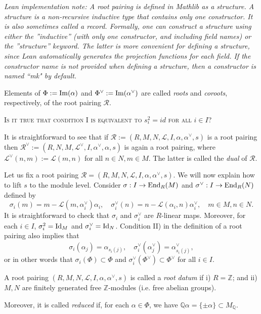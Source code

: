{\it Lean implementation note: A root pairing is defined in Mathlib as a {\it structure}. A structure is a non-recursive inductive 
type that contains only one constructor. It is also sometimes called a {\it record}. Formally, one can construct a structure using either
the ''inductive'' (with only one constructor, and including field names) or the ''structure'' keyword. The latter is more convenient for defining a structure,
since Lean automatically generates the projection functions for each field. If the constructor name is not provided when defining a structure, then a 
constructor is named ``mk" by default.}

Elements of $\Phi := {\rm Im}(\alpha)$ and $\Phi^\vee := {\rm Im}(\alpha^\vee)$ are called {\it roots} and {\it coroots}, 
respectively, of the root pairing $\mathcal{R}$. 

\textsc{Is it true that condition I is equivalent to $s_i^2 = id$ for all $i \in I$?}

\begin{remark}
    \label{def:dual-root-pairing}
    \leanok
It is straightforward to see that if $\mathcal{R} := (R,M,N,\mathcal{L},I,\alpha, \alpha^\vee,s)$ is 
a root pairing then $\mathcal{R}^\vee := (R,N,M,\mathcal{L}^\vee,I,\alpha^\vee, \alpha,s)$ is again 
a root pairing, where $\mathcal{L}^\vee (n,m) := \mathcal{L}(m,n)$ for all $n \in N,m \in M$. The 
latter is called the {\it dual} of $\mathcal{R}$.
\end{remark}

Let us fix a root pairing $\mathcal{R} = (R,M,N,\mathcal{L},I,\alpha, \alpha^\vee,s)$. We will now 
explain how to lift $s$ to the module level. Consider $\sigma: I \to {\rm End}_R(M)$ and 
$\sigma^\vee : I \to {\rm End}_R(N)$ defined by
\[
    \sigma_i(m) = m - \mathcal{L}(m,\alpha^\vee_i)\alpha_i, \quad \sigma^\vee_i(n) = n - \mathcal{L}(\alpha_i,n)\alpha^\vee_i, \quad m \in M, n \in N.
\]
It is straightforward to check that $\sigma_i$ and $\sigma^\vee_i$ are $R$-linear maps. Moreover, 
for each $i \in I$, $\sigma_i^2 = {\rm Id}_M$ and $\sigma_i^\vee = {\rm Id}_N$. Condition II) in the 
definition of a root pairing also implies that 
\[
    \sigma_i(\alpha_j) = \alpha_{s_i(j)}, \quad \sigma^\vee_i(\alpha^\vee_j) = \alpha^\vee_{s_i(j)},
\]
or in other words that $\sigma_i(\Phi) \subset \Phi$ and 
$\sigma_i^\vee(\Phi^\vee) \subset \Phi^\vee$ for all $i \in I$.

\begin{definition}
    \label{def:root-datum}
    \leanok
     A root pairing $(R,M,N,\mathcal{L},I,\alpha, \alpha^\vee,s)$ is called a {\it root datum} if 
    i) $R = \mathbb{Z}$; and ii) $M,N$ are finitely generated free $\mathbb{Z}$-modules (i.e. free abelian groups).
    
    Moreover, it is called {\it reduced} if, for each $\alpha \in \Phi$, we have 
    $\mathbb{Q}\alpha = \{\pm \alpha\} \subset M_{\mathbb{Q}}$.
\end{definition}

